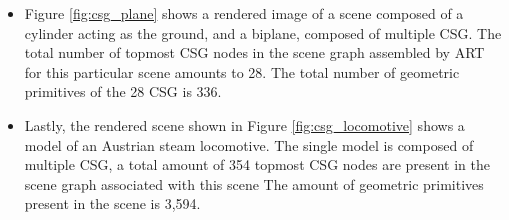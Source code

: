 \begin{itemize}
	\item Figure \ref{fig:csg_plane} shows a rendered image of a scene composed of a cylinder acting as the ground, and a biplane, composed of multiple CSG. The total number of topmost CSG nodes in the scene graph assembled by ART for this particular scene amounts to 28. The total number of geometric primitives of the 28 CSG is 336.
	
	\item Lastly, the rendered scene shown in Figure \ref{fig:csg_locomotive} shows a model of an Austrian steam locomotive. The single model is composed of multiple CSG, a total amount of 354 topmost CSG nodes are present in the scene graph associated with this scene The amount of geometric primitives present in the scene is 3,594.
	
	
\end{itemize}

